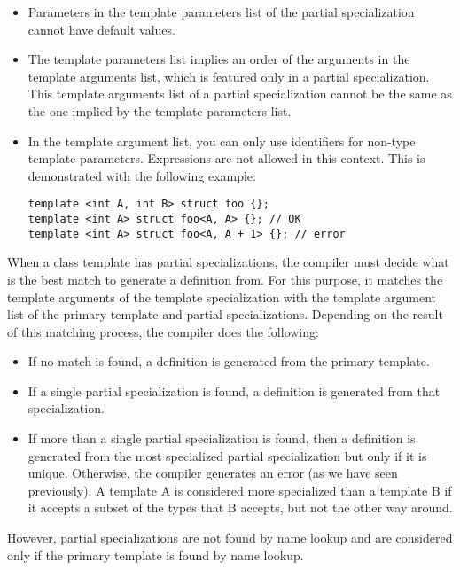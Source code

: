 \begin{itemize}
\item 
Parameters in the template parameters list of the partial specialization cannot have default values.

\item 
The template parameters list implies an order of the arguments in the template arguments list, which is featured only in a partial specialization. This template arguments list of a partial specialization cannot be the same as the one implied by the template parameters list.

\item 
In the template argument list, you can only use identifiers for non-type template parameters. Expressions are not allowed in this context. This is demonstrated with the following example:
\begin{lstlisting}[style=styleCXX]
template <int A, int B> struct foo {};
template <int A> struct foo<A, A> {}; // OK
template <int A> struct foo<A, A + 1> {}; // error
\end{lstlisting}
\end{itemize}

When a class template has partial specializations, the compiler must decide what is the best match to generate a definition from. For this purpose, it matches the template arguments of the template specialization with the template argument list of the primary template and partial specializations. Depending on the result of this matching process, the compiler does the following:

\begin{itemize}
\item 
If no match is found, a definition is generated from the primary template.

\item 
If a single partial specialization is found, a definition is generated from that specialization.

\item 
If more than a single partial specialization is found, then a definition is generated from the most specialized partial specialization but only if it is unique. Otherwise, the compiler generates an error (as we have seen previously). A template A is considered more specialized than a template B if it accepts a subset of the types that B accepts, but not the other way around.
\end{itemize}

However, partial specializations are not found by name lookup and are considered only if the primary template is found by name lookup.

